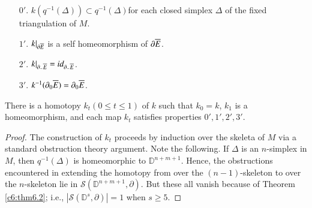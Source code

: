 \begin{itemize}
\item[$0'$.] $k (q^{-1} (\Delta)) \subset q^{-1} (\Delta)$\pageoriginale for each
  closed simplex $\Delta$ of the fixed triangulation of $M$.
\item[$1'$.] $k|_{\partial \overline{E}}$ is a self homeomorphism of
  $\partial \overline{E}$.
\item[$2'$.] $k|_{\partial_- \overline{E}}= id_{\partial_- \overline{E}}$.
\item[$3'$.] $k^{-1} (\partial_0 \overline{E})= \partial_0 \overline{E}$.
\end{itemize}

\begin{lemma}\label{c8:lem8.1}
  There is a homotopy $k_t (0 \leq t \leq 1)$ of $k$ such that $k_0=
  k$, $k_1$ is a homeomorphism, and each map $k_t$ satisfies
  properties $0', 1', 2', 3'$. 
\end{lemma}

\begin{proof}
  The construction of $k_t$ proceeds by induction over the skeleta of
  $M$ via a standard obstruction theory argument. Note the
  following. If $\Delta$ is an $n$-simplex in $M$, then
  $q^{-1}(\Delta)$ is homeomorphic to $\mathbb{D}^{n + m+1}$. Hence,
  the obstructions encountered in extending the homotopy from over the
  $(n-1)$-skeleton to over the  $n$-skeleton lie in $\mathcal{S}
  (\mathbb{D}^{n+ m+1}, \partial)$. But these all vanish because of
  Theorem \ref{c6:thm6.2}; i.e., $|\mathcal{S} (\mathbb{D}^s,
  \partial)|=1$ when $s \geq 5$.
\end{proof}

